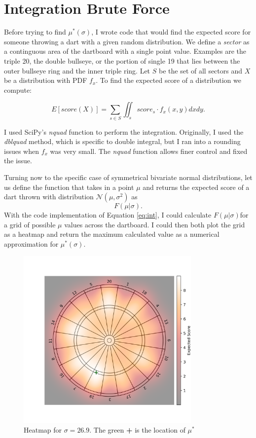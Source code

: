 \documentclass[]{article}
\newcommand{\mustar}{\ensuremath{\mu^* }}
\newcommand{\fmusig}{\ensuremath{F(\mu \vert \sigma)}}
\begin{document}
\section{Integration Brute Force}
Before trying to find $\mu^*(\sigma)$, I wrote code that would find the expected score for someone throwing a dart with a given random distribution. We define a \textit{sector} as a continguous area of the dartboard with a single point value. Examples are the triple 20, the double bullseye, or the portion of single 19 that lies between the outer bullseye ring and the inner triple ring. Let $S$ be the set of all sectors and $X$ be a distribution with PDF $f_x$. To find the expected score of a distribution we compute:



\begin{equation}
	E[score(X)] = \sum_{s \in S} \iint_{s} score_s \cdot  f_x(x, y)  dxdy.
	\label{eq:int}
\end{equation}

I used SciPy's \textit{nquad} function to perform the integration. Originally, I used the \textit{dblquad} method, which is specific to double integral, but I ran into a rounding issues when $f_x$ was very small. The \textit{nquad} function allows finer control and fixed the issue. 

Turning now to the specific case of symmetrical bivariate normal distributions,  let us define the function that takes in a point $\mu$ and returns the expected score of a dart thrown with distribution $\mathcal{N}(\mu, \sigma^2)$ as
\begin{equation}
	F(\mu \vert \sigma).
	\label{eq:fmusig}
\end{equation}
With the code implementation of Equation \ref{eq:int}, I could calculate \fmusig for a grid of possible $\mu$ values across the dartboard. I could then both plot the grid as a heatmap and return the maximum calculated value as a numerical approximation for $\mu^*(\sigma)$.

\begin{figure}[h]
	\centering
	\includegraphics[width=0.8\textwidth]{../images/gist_hear.png}
	\caption{Heatmap for $\sigma = 26.9$. The green \textbf{+} is the location of  \mustar}
	\label{fig:basicheatmap}
\end{figure}
\end{document}
